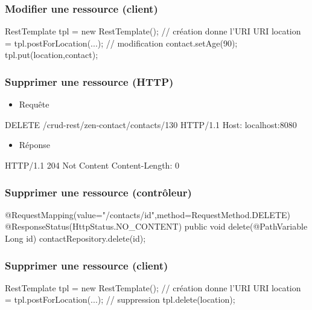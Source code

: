 \begin{frame}[fragile]
 \frametitle{Modifier une ressource (client)}
 
 \begin{javacode}
RestTemplate tpl = new RestTemplate();
// cr\'eation donne l'URI
URI location = tpl.postForLocation(...);
// modification
contact.setAge(90);
tpl.put(location,contact);
 \end{javacode}  

\end{frame}

\begin{frame}[fragile]
 \frametitle{Supprimer une ressource (HTTP)}
 
 \begin{itemize}
  \item Requête
 \end{itemize} 
 
 \begin{textcode}
DELETE /crud-rest/zen-contact/contacts/130 HTTP/1.1
Host: localhost:8080
 \end{textcode}
 
  \begin{itemize}
  \item Réponse
 \end{itemize} 
 
 \begin{textcode}
HTTP/1.1 204 Not Content
Content-Length: 0
 \end{textcode}

\end{frame}

\begin{frame}[fragile]
 \frametitle{Supprimer une ressource (contrôleur)}
 
 \begin{javacode}
@RequestMapping(value="/contacts/{id}",method=RequestMethod.DELETE)
@ResponseStatus(HttpStatus.NO_CONTENT)
public void delete(@PathVariable Long id) {
  contactRepository.delete(id);
}
 \end{javacode}  

\end{frame}

\begin{frame}[fragile]
 \frametitle{Supprimer une ressource (client)}
 
 \begin{javacode}
RestTemplate tpl = new RestTemplate();
// cr\'eation donne l'URI
URI location = tpl.postForLocation(...);
// suppression
tpl.delete(location);
 \end{javacode}  

\end{frame}

